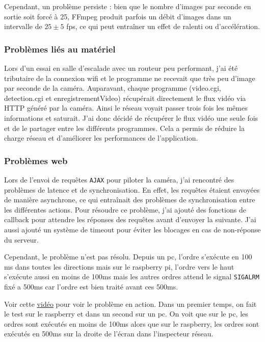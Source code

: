 \documentclass[a4paper, 11pt, french]{article}
\begin{document}
Cependant, un problème persiste : bien que le nombre d'images par seconde en sortie soit forcé à 25, FFmpeg produit parfois un débit d'images dans un intervalle de \(25\pm 5\) fps, ce qui peut entraîner un effet de ralenti ou d'accélération.

\subsubsection{Problèmes liés au matériel} Lors d'un essai en salle d'escalade avec un routeur peu performant, j'ai été tributaire de la connexion wifi et le programme ne recevait que très peu d'image par seconde de la caméra. Auparavant, chaque programme (video.cgi, detection.cgi et enregistrementVideo) récupérait directement le flux vidéo via HTTP généré par la caméra. Ainsi le réseau voyait passer trois fois les mêmes informations et saturait. J'ai donc décidé de récupérer le flux vidéo une seule fois et de le partager entre les différents programmes. Cela a permis de réduire la charge réseau et d'améliorer les performances de l'application.

\subsubsection{Problèmes web} Lors de l'envoi de requêtes \texttt{AJAX} pour piloter la caméra, j'ai rencontré des problèmes de latence et de synchronisation. En effet, les requêtes étaient envoyées de manière asynchrone, ce qui entraînait des problèmes de synchronisation entre les différentes actions. Pour résoudre ce problème, j'ai ajouté des fonctions de callback pour attendre les réponses des requêtes avant d'envoyer la suivante. J'ai aussi ajouté un système de timeout pour éviter les blocages en cas de non-réponse du serveur.

Cependant, le problème n'est pas résolu. Depuis un pc, l'ordre s’exécute en 100 ms dans toutes les directions mais sur le raspberry pi, l'ordre vers le haut s'exécute aussi en moins de 100ms mais les autres ordres attend le signal \texttt{SIGALRM} fixé a 500ms car l'ordre est bien traité avant ces 500ms. 

Voir cette \href{https://youtu.be/0Z2cE6WyGWY}{vidéo} pour voir le problème en action. Dans un premier temps, on fait le test sur le raspberry et dans un second sur un pc. On voit que sur le pc, les ordres sont exécutés en moins de 100ms alors que sur le raspberry, les ordres sont exécutés en 500ms sur la droite de l'écran dans l'inspecteur réseau.
\end{document}
